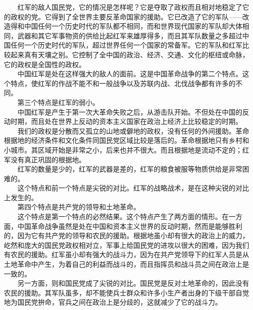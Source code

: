 \documentclass[cn,11pt,chinese]{elegantbook}
\begin{document}
　　红军的敌人国民党，它的情况是怎样呢？它是夺取了政权而且相对地稳定了它的政权的党。它得到了全世界主要反革命国家的援助。它已改造了它的军队——改造得和中国任何一个历史时代的军队都不相同，而和世界现代国家的军队却大体相同，武器和其它军事物资的供给比起红军来雄厚得多，而且其军队数量之多超过中国任何一个历史时代的军队，超过世界任何一个国家的常备军。它的军队和红军比较起来真有天壤之别。它控制了全中国的政治、经济、交通、文化的枢纽或命脉，它的政权是全国性的政权。\\
　　中国红军是处在这样强大的敌人的面前。这是中国革命战争的第二个特点。这个特点，使红军的作战不能不和一般战争以及苏联内战、北伐战争都有许多的不同。\\
　　第三个特点是红军的弱小。\\
　　中国红军是产生于第一次大革命失败之后，从游击队开始。不但处在中国的反动时期，而且处在世界上反动的资本主义国家在政治上经济上比较稳定的时期。\\
　　我们的政权是分散而又孤立的山地或僻地的政权，没有任何的外间援助。革命根据地的经济条件和文化条件同国民党区域比较是落后的。革命根据地只有乡村和小城市。其区域开始是非常之小，后来也并不很大。而且根据地是流动不定的；红军没有真正巩固的根据地。\\
　　红军的数量是少的，红军的武器是差的，红军的粮食被服等物质供给是非常困难的。\\
　　这个特点和前一个特点是尖锐的对比。红军的战略战术，是在这种尖锐的对比上发生的。\\
　　第四个特点是共产党的领导和土地革命。\\
　　这个特点是第一个特点的必然结果。这个特点产生了两方面的情形。在一方面，中国革命战争虽然是处在中国和资本主义世界的反动时期，然而是能够胜利的，因为它有共产党的领导和农民的援助。根据地虽小却有很大的政治上的威力，屹然和庞大的国民党政权相对立，军事上给国民党的进攻以很大的困难，因为我们有农民的援助。红军虽小却有强大的战斗力，因为在共产党领导下的红军人员是从土地革命中产生，为着自己的利益而战斗的，而且指挥员和战斗员之间在政治上是一致的。\\
　　另一方面，则和国民党成了尖锐的对比。国民党是反对土地革命的，因此没有农民的援助。其军队虽多，却不能使兵士群众和许多小生产者出身的下级干部自觉地为国民党拚命，官兵之间在政治上是分歧的，这就减少了它的战斗力。\\
\end{document}
